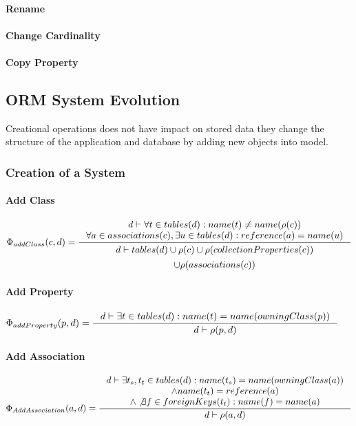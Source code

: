 \documentclass[11pt]{article}
\begin{document}
\paragraph{Rename}
\paragraph{Change Cardinality}
\paragraph{Copy Property}


\subsection{ORM System Evolution}
Creational operations does not have impact on stored data they change the structure of the application and database by adding new objects into model.

\subsubsection{Creation of a System}
\paragraph{Add Class}

$
\Phi_{addClass}(c, d) = \inference{d \vdash \forall t \in tables(d) : name(t) \neq name(\rho(c)) \\
	\forall a \in associations(c), \exists u \in  tables(d) : reference(a) = name(u) 
}{
\begin{gathered}
d \vdash  tables(d) \cup \rho(c) \cup \rho(collectionProperties(c)) \\ \cup \rho(associations(c))
\end{gathered}
}
$
\paragraph{Add Property}
$
\Phi_{addProperty}(p, d) = 
\inference{d \vdash \exists t \in tables(d) : name(t) = name(owningClass(p))}{d \vdash \rho(p,d)} 
$
\paragraph{Add Association}
$
\Phi_{AddAssociation}(a, d) = \inference{d \vdash \exists t_s, t_t \in tables(d) : name(t_s) = name(owningClass(a)) \\ \wedge name(t_t) = reference(a) \\ \wedge \not \exists f \in foreignKeys(t_t) : name(f) = name(a) }{d \vdash \rho(a,d)}
$
\end{document}
